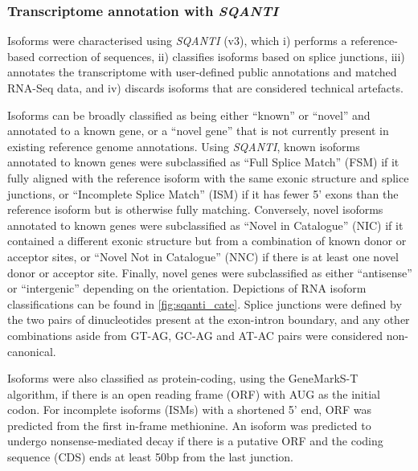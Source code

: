\subsubsection{Transcriptome annotation with \textit{SQANTI}}
\label{section: sqanti_annotations}
Isoforms were characterised using \textit{SQANTI}\cite{Tardaguila2018} (v3), which i) performs a reference-based correction of sequences, ii) classifies isoforms based on splice junctions, iii) annotates the transcriptome with user-defined public annotations and matched RNA-Seq data, and iv) discards isoforms that are considered technical artefacts. 

Isoforms can be broadly classified as being either “known” or “novel” and annotated to a known gene, or a “novel gene” that is not currently present in existing reference genome annotations. Using \textit{SQANTI}, known isoforms annotated to known genes were subclassified as “Full Splice Match” (FSM) if it fully aligned with the reference isoform with the same exonic structure and splice junctions, or “Incomplete Splice Match” (ISM) if it has fewer 5’ exons than the reference isoform but is otherwise fully matching. Conversely, novel isoforms annotated to known genes were subclassified as “Novel in Catalogue” (NIC) if it contained a different exonic structure but from a combination of known donor or acceptor sites, or “Novel Not in Catalogue” (NNC) if there is at least one novel donor or acceptor site. Finally, novel genes were subclassified as either “antisense” or “intergenic” depending on the orientation. Depictions of RNA isoform classifications can be found in \cref{fig:sqanti_cate}. Splice junctions were defined by the two pairs of dinucleotides present at the exon-intron boundary, and any other combinations aside from GT-AG, GC-AG and AT-AC pairs were considered non-canonical. 

Isoforms were also classified as protein-coding, using the GeneMarkS-T algorithm\cite{Tang2015}, if there is an open reading frame (ORF) with AUG as the initial codon. For incomplete isoforms (ISMs) with a shortened 5' end, ORF was predicted from the first in-frame methionine. An isoform was predicted to undergo nonsense-mediated decay if there is a putative ORF and the coding sequence (CDS) ends at least 50bp from the last junction. 

